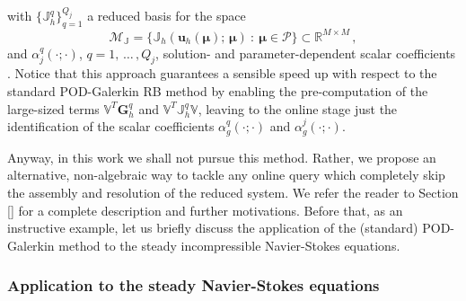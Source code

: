 \documentclass[12pt, a4paper, twoside, openright]{report}
\numberwithin{equation}{chapter}
\theoremstyle{theorem}
\theoremstyle{definition}
\theoremstyle{remark}
\theoremstyle{proposition}
\numberwithin{figure}{chapter}
\newcommand{\bg}[1]{\boldsymbol{#1}}
\begin{document}
		with $\big\lbrace \mathbb{J}_h^q \big\rbrace_{q = 1}^{Q_j}$ a reduced basis for the space
		\begin{equation*}
			\mathcal{M}_{\mathbb{J}} = \big\lbrace \mathbb{J}_h(\mathbf{u}_h(\bg{\mu}); \, \bg{\mu}) ~ : ~ \bg{\mu} \in \mathcal{P} \big\rbrace \subset \mathbb{R}^{M \times M} \, ,
		\end{equation*}
		and $\alpha_j^q(\cdot; \cdot)$, $q = 1, \, \ldots \, , Q_j$, solution- and parameter-dependent scalar coefficients \cite{QMN15}. Notice that this approach guarantees a sensible speed up with respect to the standard POD-Galerkin RB method by enabling the pre-computation of the large-sized terms $\mathbb{V}^T \mathbf{G}_h^q$ and $\mathbb{V}^T \mathbb{J}_h^q \mathbb{V}$, leaving to the online stage just the identification of the scalar coefficients $\alpha_g^q(\cdot; \cdot)$ and $\alpha_g^j(\cdot; \cdot)$. 
		
		Anyway, in this work we shall not pursue this method. Rather, we propose an alternative, non-algebraic way to tackle any online query which completely skip the assembly and resolution of the reduced system. We refer the reader to Section \ref{} for a complete description and further motivations. Before that, as an instructive example, let us briefly discuss the application of the (standard) POD-Galerkin method to the steady incompressible Navier-Stokes equations.
		
	\subsubsection{Application to the steady Navier-Stokes equations}
	\label{subsubsection:Application to the steady Navier-Stokes equations}
		
\end{document}
